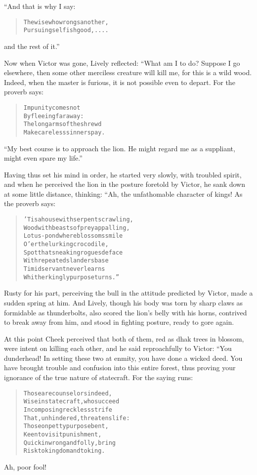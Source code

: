 \documentclass[article, twoside, 14pt]{memoir}
\renewenvironment{verbatim}{%
\begin{quote}%
\vskip -10pt%
\begin{alltt}\normalfont\large}{\end{alltt}%
\end{quote}%
\vskip -10pt
} %
\begin{document}
“And that is why I say:

\begin{verbatim}
The wise who wrongs another,
    Pursuing selfish good, ....
\end{verbatim}
and the rest of it.”

Now when Victor was gone, Lively reflected: “What am I to do?
Suppose I go elsewhere, then some other merciless creature will
kill me, for this is a wild wood. Indeed, when the master is
furious, it is not possible even to depart. For the proverb says:

\begin{verbatim}
Impunity comes not
    By fleeing far away:
The long arms of the shrewd
    Make careless sinners pay.
\end{verbatim}
``My best course is to approach the lion. He might regard me as a suppliant, might even spare my life.''

Having thus set his mind in order, he started very slowly,
with troubled spirit, and when he perceived the lion in the posture
foretold by Victor, he sank down at some little distance, thinking:
“Ah, the unfathomable character of kings! As the proverb says:

\begin{verbatim}
'Tis a house with serpents crawling,
Wood with beasts of prey appalling,
Lotus-pond where blossoms smile
O'er the lurking crocodile,
Spot that sneaking rogues deface
With repeated slanders base{\textemdash}
Timid servant never learns
Whither kingly purpose turns.”
\end{verbatim}
Rusty for his part, perceiving the bull in the attitude predicted
by Victor, made a sudden spring at him. And Lively, though his body
was torn by sharp claws as formidable as thunderbolts, also scored
the lion's belly with his horns, contrived to break away from him,
and stood in fighting posture, ready to gore again.

At this point Cheek perceived that both of them, red as dhak trees
in blossom, were intent on killing each other, and he said
reproachfully to Victor: “You dunderhead! In setting these two at
enmity, you have done a wicked deed. You have brought trouble and
confusion into this entire forest, thus proving your ignorance of
the true nature of statecraft. For the saying runs:

\begin{verbatim}
Those are counselors indeed,
Wise in statecraft, who succeed
In composing reckless strife
That, unhindered, threatens life:
Those on petty purpose bent,
Keen to visit punishment,
Quick in wrong and folly, bring
Risk to kingdom and to king.
\end{verbatim}
Ah, poor fool!
\end{document}
